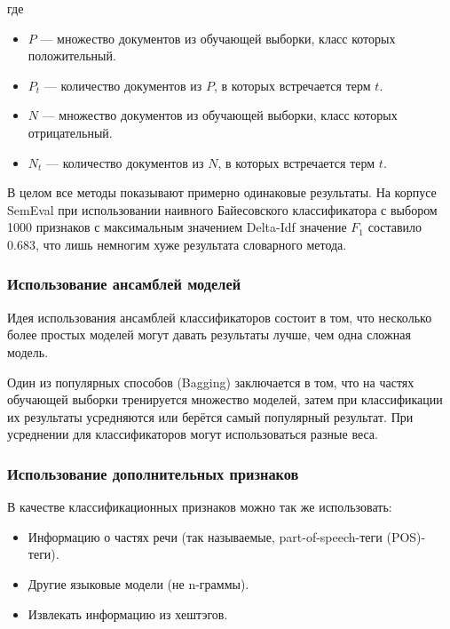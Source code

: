 \begin{enumerate}
где 
\begin{itemize}

\item
$P$ --- множество документов из обучающей выборки, класс которых положительный.

\item
$P_t$ --- количество документов из $P$, в которых встречается терм $t$.

\item
$N$ --- множество документов из обучающей выборки, класс которых отрицательный.

\item
$N_t$ --- количество документов из $N$, в которых встречается терм $t$.

\end{itemize}

\end{enumerate}

В целом все методы показывают примерно одинаковые результаты. 
На корпусе SemEval при использовании наивного
Байесовского классификатора с выбором 1000 признаков
с максимальным значением Delta-Idf значение $F_1$ составило 0.683, 
что лишь немногим хуже результата словарного метода. 

\subsubsection{Использование ансамблей моделей}
Идея использования ансамблей классификаторов состоит в том,
что несколько более простых моделей могут давать результаты
лучше, чем одна сложная модель.

Один из популярных способов (Bagging) заключается в том, что
на частях обучающей выборки тренируется множество моделей,
затем при классификации их результаты усредняются или 
берётся самый популярный результат.
При усреднении для классификаторов могут использоваться разные веса.

\subsubsection{Использование дополнительных признаков}
В качестве классификационных признаков можно так же использовать:
\begin{itemize}

\item
Информацию о частях речи (так называемые, part-of-speech-теги (POS)-теги).

\item
Другие языковые модели (не n-граммы).

\item
Извлекать информацию из хештэгов.

\end{itemize}